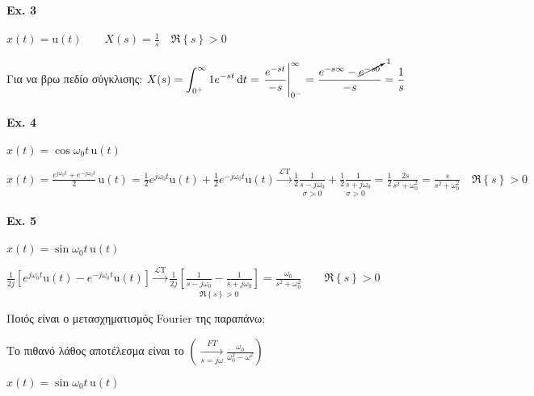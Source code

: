 \documentclass[11pt,a4paper,titlepage,fleqn]{article}
\begin{document}
   \paragraph{Ex. 3}
   \( x(t)=\mathrm u(t) \qquad X(s)=\frac{1}{s} 
   \quad \Re\left\lbrace s \right\rbrace > 0\)
   
   Για να βρω πεδίο σύγκλισης: \( \displaystyle
   X(s) =
   \int_{0^+}^\infty 1e^{-st}\dif t = \left.
   \frac{e^{-st}}{-s}\right|_{0^-}^\infty
   = \frac{e^{-s\infty}-\cancelto{1}{e^{-s0}}}{-s}=\frac{1}{s}
    \)
    
   \paragraph{Ex. 4}
   \( x(t)=\cos\omega_0 t\, \mathrm u(t) \)
   
   \( \displaystyle
   x(t) = \frac{e^{j\omega_0 t}+e^{-j\omega_0 t}}{2}\, \mathrm u(t)
   =\frac{1}{2}e^{j\omega_0 t}\mathrm u(t)
   +\frac{1}{2}e^{-j\omega_0 t}\mathrm u(t)
   \xrightarrow{\mathscr L \mathrm T}
    \frac{1}{2}
    \underset{\sigma >0}{\frac{1}{s-j\omega_0}}+
    \underset{\sigma >0}{\frac{1}{2}\frac{1}{s+j\omega_0}}
    = \frac{1}{2} \frac{2s}{s^2+\omega_0^2}
    =\frac{s}{s^2+\omega_0^2} \quad \Re\left\lbrace s \right\rbrace>0
    \)
    
    \paragraph{Ex. 5}
    \( x(t)=\sin\omega_0 t\, \mathrm u(t) \)
    
    \( \displaystyle
    \frac{1}{2j}\left[
    e^{j\omega_0 t}\mathrm u(t)-e^{-j\omega_0 t}\mathrm u(t)
    \right] \xrightarrow{\mathscr L \mathrm T}
    \frac{1}{2j}\underset{\Re\left\lbrace s \right\rbrace>0}{
    	\left[ \frac{1}{s-j\omega_0} - \frac{1}{s+j\omega_0} \right]
    } = \frac{\omega_0}{s^2+\omega_0^2}
     \qquad \Re \left\lbrace s \right\rbrace > 0
     \)
     
    Ποιός είναι ο μετασχηματισμός Fourier της παραπάνω;
    
    Το πιθανό λάθος αποτέλεσμα είναι το \( 
    \displaystyle \left(
    \xrightarrow[s=j\omega ]{FT} \frac{\omega_0}{\omega_0^2-\omega^2}
    \right)
     \)
     
    \( x(t) = \sin\omega_0t\, \mathrm u(t) \)
    
\end{document}
